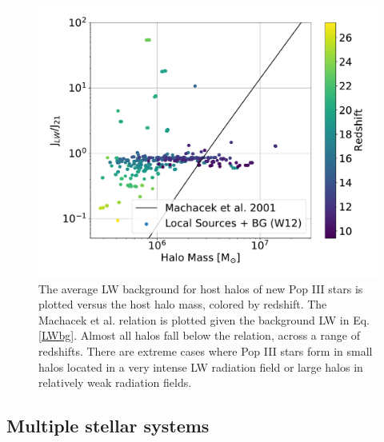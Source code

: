 \documentclass[fleqn,usenatbib]{mnras}
\begin{document}
\begin{figure}
	\includegraphics[width=\columnwidth]{images/jlw_mass_machacek_total.pdf}
	\caption{The average LW background for host halos of new Pop III stars is plotted versus the host halo mass, colored by redshift. The Machacek et al. relation is plotted given the background LW in Eq. \ref{LWbg}. Almost all halos fall below the relation, across a range of redshifts. There are extreme cases where Pop III stars form in small halos located in a very intense LW radiation field or large halos in relatively weak radiation fields.}
    \label{fig:jlw_mass_machacek}
\end{figure}

\subsection{Multiple stellar systems}
\end{document}
